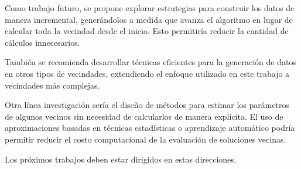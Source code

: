 \documentclass[12pt]{report}
\begin{document}
	Como trabajo futuro, se propone explorar estrategias para construir los datos de manera incremental, generándolos a medida que avanza el algoritmo en lugar de calcular toda la vecindad desde el inicio. Esto permitiría reducir la cantidad de cálculos innecesarios.

	También se recomienda desarrollar técnicas eficientes para la generación de datos en otros tipos de vecindades, extendiendo el enfoque utilizado en este trabajo a vecindades más complejas.

	Otra línea investigación sería el diseño de métodos para estimar los parámetros de algunos vecinos sin necesidad de calcularlos de manera explícita. El uso de aproximaciones basadas en técnicas estadísticas o aprendizaje automático podría permitir reducir el costo computacional de la evaluación de soluciones vecinas.

	Los próximos trabajos deben estar dirigidos en estas direcciones.
\end{document}
